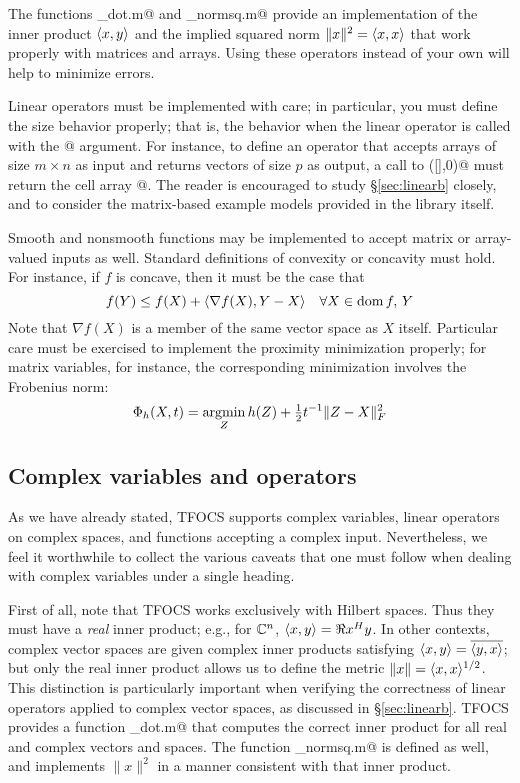 \documentclass{article}
\begin{document}
The functions \verb@tfocs_dot.m@ and \verb@tfocs_normsq.m@ 
provide an implementation of the inner product $\langle x,y\rangle$ 
and the implied squared norm $\|x\|^2=\langle x,x\rangle$ that work
properly with matrices and arrays. Using these operators
instead of your own will help to minimize errors.

Linear operators must be implemented with care; in particular, you 
must define the size behavior properly; that is, the behavior
when the linear operator is called with the @
argument. For instance, to define an operator \verb@linearF@
that accepts
arrays of size $m\times n$ as input and returns vectors of
size $p$ as output, a call to \verb@linearF([],0)@ must
return the cell array \verb@{[m,n],[p,1]}@. The reader
is encouraged to study \S\ref{sec:linearb} closely, and to
consider the matrix-based example models provided in the library itself.

Smooth and nonsmooth functions may be implemented
to accept matrix or array-valued inputs as well. Standard
definitions of convexity or concavity must hold. For instance,
if $f$ is concave, then it must be the case that
\begin{equation}
	f(Y) \leq f(X) + \langle \nabla f(X), Y - X \rangle \quad \forall X\in\operatorname{\textrm{dom}} f,\,Y
\end{equation}
Note that $\nabla f(X)$ is a member of the same vector space as $X$ itself.
Particular care must be exercised to implement the proximity minimization
properly; for matrix variables, for instance, the corresponding 
minimization involves the Frobenius norm:
\begin{equation}
	\Phi_h(X,t) = \operatorname*{argmin}_Z h(Z) + {\textstyle\frac{1}{2}} t^{-1} \|Z-X\|_F^2
\end{equation}

\subsection{Complex variables and operators}

As we have already stated, TFOCS supports complex variables, linear
operators on complex spaces, and functions accepting a complex input.
Nevertheless, we feel it worthwhile to collect the various caveats
that one must follow when dealing with complex variables under a single
heading.

First of all, note that TFOCS works exclusively with Hilbert spaces.
Thus they must have a \emph{real} inner product; e.g., for
$\mathbb{C}^n$, $\langle x,y\rangle=\Re x^H y$. In other contexts, complex vector
spaces are given complex inner products satisfying $\langle x,y\rangle=\overline{\langle y,x\rangle}$;
but only the real inner product allows us to define the metric
$\|x\|=\langle x,x\rangle^{1/2}$. This distinction is particularly important when
verifying the correctness of linear operators applied to complex
vector spaces, as discussed in \S\ref{sec:linearb}. TFOCS provides
a function \verb@tfocs_dot.m@ that computes the correct inner
product for all real and complex vectors and spaces. The function
\verb@tfocs_normsq.m@ is defined as well, and implements $\|x\|^2$
in a manner consistent with that inner product.
\end{document}
